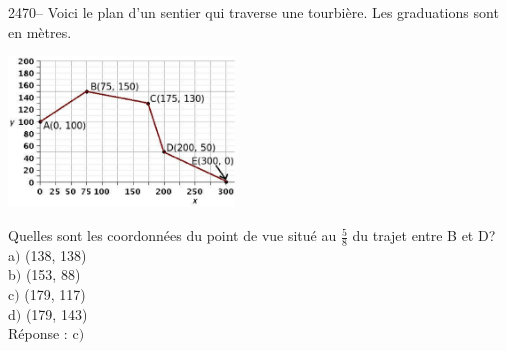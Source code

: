 \documentclass[letterpaper, 12pt]{article}
\begin{document}
2470--  Voici le plan d'un sentier qui traverse une tourbi\`ere. Les graduations sont en m\`etres. \\
\begin{center}
 \includegraphics[width=6cm,bb=14 14 531 362]{Q2468.eps}
\end{center}
Quelles sont les coordonn\'ees du point de vue situ\'e au $\frac{5}{8}$ du trajet entre B et D?\\

a$)$ (138, 138)\\
b$)$ (153, 88)\\
c$)$ (179, 117)\\
d$)$ (179, 143)\\

R\'eponse : c$)$\\
\end{document}
